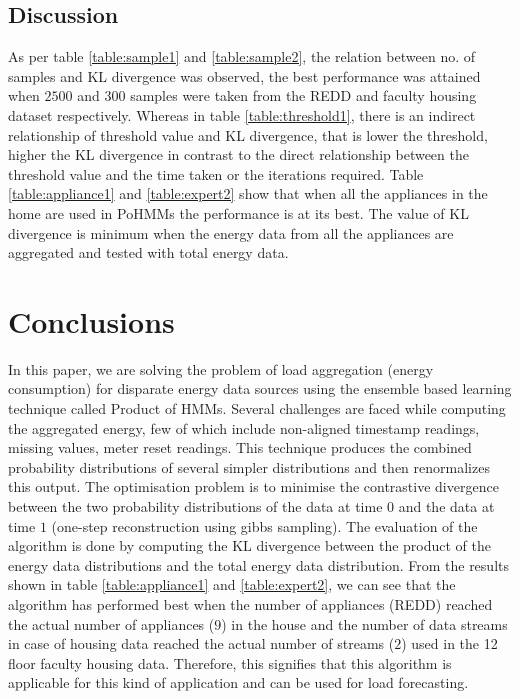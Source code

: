 \documentclass[conference]{IEEEtran}
\begin{document}
\subsection{Discussion}
As per table \ref{table:sample1} and \ref{table:sample2}, the relation between no. of samples and KL divergence was observed, the best performance was attained when $2500$ and $300$ samples were taken from the REDD and faculty housing dataset respectively. Whereas in table \ref{table:threshold1}, there is an indirect relationship of threshold value and KL divergence, that is lower the threshold, higher the KL divergence in contrast to the
 direct relationship between the threshold value and the time taken or the iterations required. Table \ref{table:appliance1} and \ref{table:expert2} show that when all the appliances in the home are used in PoHMMs the performance is at its best. The value of KL divergence is minimum when the energy data from all the appliances are aggregated and tested with total energy data. %

\section{Conclusions}
In this paper, we are solving the problem of load aggregation (energy consumption) for disparate energy data sources using the ensemble based learning technique called Product of HMMs. Several challenges are faced while computing the aggregated energy, few of which include non-aligned timestamp readings, missing values, meter reset readings. This technique produces the combined probability distributions of several simpler distributions and then renormalizes this output. The optimisation problem is to minimise the contrastive divergence between the two probability distributions of the data at time $0$ and the data at time $1$ (one-step reconstruction using gibbs sampling). The evaluation of the algorithm is done by computing the KL divergence between the product of the energy data distributions and the total energy data distribution. From the results shown in table \ref{table:appliance1} and \ref{table:expert2}, we can see that the algorithm has performed best when the number of appliances (REDD) reached the actual number of appliances ($9$) in the house and the number of data streams in case of housing data reached the actual number of streams ($2$) used in the 12 floor faculty housing data. Therefore, this signifies that this algorithm is applicable for this kind of application and can be used for load forecasting.
\end{document}
